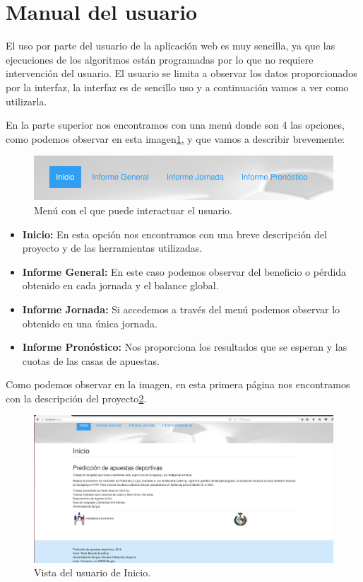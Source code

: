\section{Manual del usuario}
El uso por parte del usuario de la aplicación web es muy sencilla, ya que las ejecuciones de los algoritmos están programadas por lo que no requiere intervención del usuario. El usuario se limita a observar los datos proporcionados por la interfaz, la interfaz es de sencillo uso y a continuación vamos a ver como utilizarla.

En la parte superior nos encontramos con una menú donde son 4 las opciones, como podemos observar en esta imagen\ref{fig:MenuDru}, y que vamos a describir brevemente:
\begin{figure}
\centering
\includegraphics[width=.9\textwidth]{img/drupal_menu}
\caption{Menú con el que puede interactuar el usuario.}
\label{fig:MenuDru}
\end{figure}

\begin{itemize}
\item \textbf{Inicio: } En esta opción nos encontramos con una breve descripción del proyecto y de las herramientas utilizadas.
\item \textbf{Informe General: } En este caso podemos observar del beneficio o pérdida obtenido en cada jornada y el balance global.
\item \textbf{Informe Jornada: } Si accedemos a través del menú podemos observar lo obtenido en una única jornada.
\item \textbf{Informe Pronóstico: } Nos proporciona los resultados que se esperan y las cuotas de las casas de apuestas.
\end{itemize}

Como podemos observar en la imagen, en esta primera página nos encontramos con la descripción del proyecto\ref{fig:IniDruUser}.

\begin{figure}
\centering
\includegraphics[width=.9\textwidth]{img/drupal_inicio_usuario}
\caption{Vista del usuario de Inicio.}
\label{fig:IniDruUser}
\end{figure}

